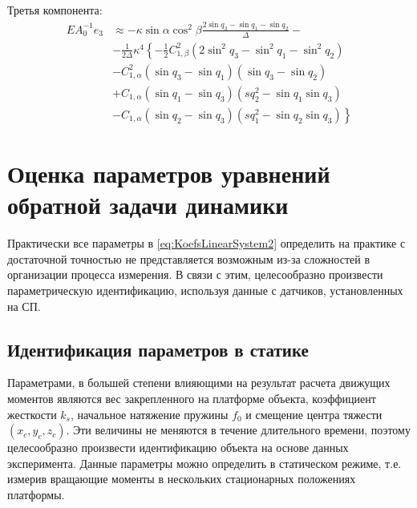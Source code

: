 Третья компонента:
\begin{equation}
\begin{aligned}
EA^{-1}_0 e_3 & \approx -\kappa\sin{\alpha}\cos^2{\beta}\frac{2\sin{q_3} - \sin{q_1} - \sin{q_2}}{\Delta} - \\
& -\frac{1}{2\Delta}\kappa^4 \left\lbrace -\frac{1}{2}C^2_{1,\beta}\left(2\sin^2{q_3} - \sin^2{q_1} - \sin^2{q_2}\right) \right. \\
& \left. -C^2_{1,\alpha}\left(\sin{q_3} - \sin{q_1}\right)\left(\sin{q_3} - \sin{q_2}\right)\right. \\
& \left. +C_{1,\alpha}\left(\sin{q_1} - \sin{q_3}\right)\left(sq^2_2 - \sin{q_1}\sin{q_3}\right)\right. \\
& \left. -C_{1,\alpha}\left(\sin{q_2} - \sin{q_3}\right)\left(sq^2_1 - \sin{q_2}\sin{q_3}\right)\right\rbrace
\end{aligned}
\end{equation}


\section{Оценка параметров уравнений обратной задачи динамики}
Практически все параметры в \ref{eq:KoefsLinearSystem2} определить на практике с достаточной точностью не представляется возможным из-за сложностей в организации процесса измерения. В связи с этим, целесообразно произвести параметрическую идентификацию, используя данные с датчиков, установленных на СП.

\subsection{Идентификация параметров в статике}
Параметрами, в большей степени влияющими на результат расчета движущих моментов являются вес закрепленного на платформе объекта, коэффициент жесткости $k_s$, начальное натяжение пружины $f_0$ и смещение центра тяжести $(x_c, y_c, z_c)$. Эти величины не меняются в течение длительного времени, поэтому целесообразно произвести идентификацию объекта на основе данных эксперимента.
	Данные параметры можно определить в статическом режиме, т.е. измерив вращающие моменты в нескольких стационарных положениях платформы.

